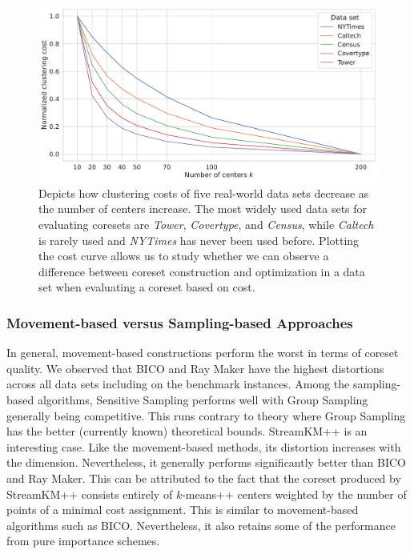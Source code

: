 \begin{figure}
  \includegraphics[width=1\linewidth]{figures/cost-curves-real-world-datasets.pdf}
  \caption{Depicts how clustering costs of five real-world data sets decrease as the number of centers increase. 
  The most widely used data sets for evaluating coresets are \textit{Tower}, \textit{Covertype}, and \textit{Census}, while \textit{Caltech} is rarely used and \textit{NYTimes} has never been used before.
  Plotting the cost curve allows us to study whether we can observe a difference between coreset construction and optimization in a data set when evaluating a coreset based on cost.
  }
  \label{fig:cost-curves-real-world-datasets}
\end{figure}



\subsubsection*{Movement-based versus Sampling-based Approaches}

In general, movement-based constructions perform the worst in terms of coreset quality. 
We observed that BICO and Ray Maker have the highest distortions across all data sets including on the benchmark instances. Among the sampling-based algorithms, Sensitive Sampling performs well with Group Sampling generally being competitive. This runs contrary to theory where Group Sampling has the better (currently known) theoretical bounds. StreamKM++ is an interesting case. Like the movement-based methods, its distortion increases with the dimension. Nevertheless, it generally performs significantly better than BICO and Ray Maker. This can be attributed to the fact that the coreset produced by StreamKM++ consists entirely of $k$-means++ centers weighted by the number of points of a minimal cost assignment. This is similar to movement-based algorithms such as BICO. Nevertheless, it also retains some of the performance from pure importance schemes.

